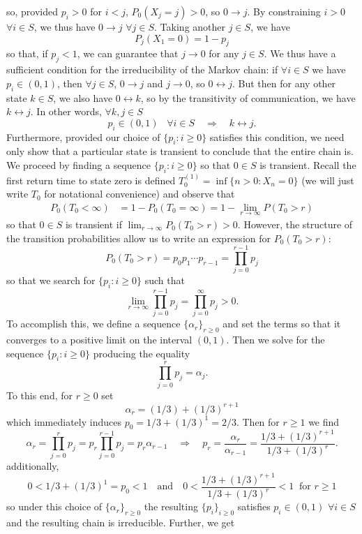 \documentclass[11pt, letterpaper]{article}
\begin{document}
    so, provided $p_i>0$ for $i< j$, $P_0(X_j=j)>0$, so $0\longrightarrow j$. By constraining $i>0$ $\forall i\in S$, we thus have $0\longrightarrow j$ $\forall j\in S$. Taking another $j\in S$, we have
    \[P_j(X_1=0)=1-p_j\]
    so that, if $p_j <1$, we can guarantee that $j\longrightarrow 0$ for any $j\in S$. We thus have a sufficient condition for the irreducibility of the Markov chain: if $\forall i\in S$ we have $p_i\in(0,1)$, then $\forall j\in S$, $0\longrightarrow j$ and $j\longrightarrow 0$, so $0\longleftrightarrow j$.
    But then for any other state $k\in S$, we also have $0\longleftrightarrow k$, so by the transitivity of communication, we have $k\longleftrightarrow j$. In other words, $\forall k,j\in S$
    \[p_i\in(0,1)\;\;\;\forall i\in S\quad\Rightarrow\quad k\longleftrightarrow j.\]
    Furthermore, provided our choice of $\{p_i:i\geq 0\}$ satisfies this condition, we need only show that a particular state is transient to conclude that the entire chain is.\\[10pt]
    We proceed by finding a sequence $\{p_i:i\geq 0\}$ so that $0\in S$ is transient. Recall the first return time to state zero is defined $T_0^{(1)}=\inf\{n>0:X_n=0\}$ (we will just write $T_0$ for notational convenience) and observe that
    \begin{align*}
        P_0(T_0<\infty)&=1-P_0(T_0=\infty)=1-\lim_{r\rightarrow\infty}P(T_0>r)
    \end{align*}
    so that $0\in S$ is transient if $\lim_{r\rightarrow\infty}P_0(T_0>r)>0$. However, the structure of the transition probabilities allow us to write an expression for $P_0(T_0>r)$:
    \[P_0(T_0>r)=p_0p_1\cdots p_{r-1}=\prod_{j=0}^{r-1}p_j\]
    so that we search for $\{p_i:i\geq 0\}$ such that
    \[\lim_{r\rightarrow\infty}\prod_{j=0}^{r-1}p_j=\prod_{j=0}^{\infty}p_j>0.\]
    To accomplish this, we define a sequence $\{\alpha_r\}_{r\geq 0}$ and set the terms so that it converges to a positive limit on the interval $(0,1)$. Then we solve for the sequence $\{p_i:i\geq 0\}$ producing the equality
    \[\prod_{j=0}^rp_j=\alpha_j.\]
    To this end, for $r\geq 0$ set
    \[\alpha_r=(1/3)+(1/3)^{r+1}\]
    which immediately induces $p_0=1/3+(1/3)^1=2/3$. Then for $r\geq 1$ we find
    \[\alpha_r=\prod_{j=0}^rp_j=p_r\prod_{j=0}^{r-1}p_j=p_r\alpha_{r-1}\quad\Rightarrow\quad p_r=\frac{\alpha_r}{\alpha_{r-1}}=\frac{1/3+(1/3)^{r+1}}{1/3+(1/3)^{r}}.\]
    additionally,
    \[0<1/3+(1/3)^1=p_0<1\quad\text{and}\quad 0<\frac{1/3+(1/3)^{r+1}}{1/3+(1/3)^r}<1\;\;\text{for $r\geq 1$}\]
    so under this choice of $\{\alpha_r\}_{r\geq 0}$ the resulting $\{p_i\}_{i\geq 0}$ satisfies $p_i\in(0,1)$ $\forall i\in S$ and the resulting chain is irreducible. Further, we get
\end{document}
